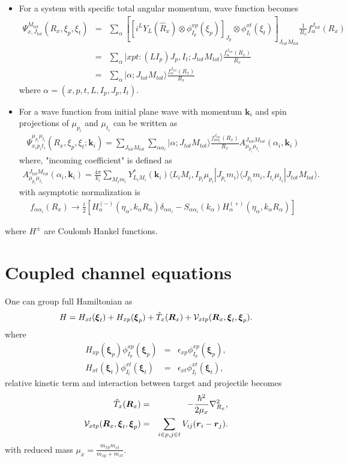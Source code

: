 \documentclass[11pt]{book}
\def\bm{\boldsymbol}
\def\vk{{\bm k}}
\def\vr{{\bm r}}
\def\la{\langle}
\def\ra{\rangle}
\newcommand{\bea}{\begin{eqnarray}}
\newcommand{\eea}{\end{eqnarray}}
\newcommand{\no}{\nonumber \\}
\begin{document}
\begin{itemize} 
\item For a system with specific total angular momentum, wave function becomes
\bea 
\Psi_{x,J_{tot}}^{M_{tot}}(R_x,\xi_p,\xi_t)
&=&\sum_{\alpha} \left[ 
    \left[i^{L} Y_{L}(\hat{R}_x)\otimes \phi^{xp}_{I_p}(\xi_p)\right]_{J_p} 
    \otimes \phi^{xt}_{I_t}(\xi_t)\right]_{J_{tot}M_{tot}}
    \frac{1}{R_x}f_{\alpha}^{J_{tot}}(R_x) \no 
&=&\sum_{\alpha} |xpt:(L I_p) J_p,I_t;J_{tot} M_{tot}\ra 
    \frac{f_{\alpha}^{J_{tot}}(R_x) }{R_x} \no 
&=&\sum_{\alpha} |\alpha; J_{tot} M_{tot}\ra \frac{f_{\alpha}^{J_{tot}}(R_x) }{R_x}
\eea 
where $\alpha=(x,p,t,L,I_p,J_p,I_t)$.
 
\item For a wave function from initial plane wave with momentum $\vk_i$ and spin projections of
    $\mu_{p_i}$ and $\mu_{t_i}$ can be written as 
\bea 
\Psi_{x_ip_it_i}^{\mu_{p_i}\mu_{t_i}}(R_x,\xi_p,\xi_t; \vk_i)
=\sum_{J_{tot}M_{tot}}\sum_{\alpha \alpha_i}
  |\alpha;J_{tot}M_{tot}\ra 
   \frac{f^{J_{tot}}_{\alpha \alpha_i}(R_x)  }{R_x} 
   A^{J_{tot} M_{tot}}_{\mu_{p_i}\mu_{t_i}}(\alpha_i,\vk_i)
\eea  
where, "incoming coefficient" is defined as
\bea 
A^{J_{tot} M_{tot}}_{\mu_{p_i}\mu_{t_i}}(\alpha_i,\vk_i)
=\frac{4\pi}{k_i}\sum_{M_i m_i} Y^*_{L_iM_i}(\vk_i)
  \la L_iM_i,I_{p_i} \mu_{p_i}| J_{p_i} m_i\ra 
  \la J_{p_i} m_i,I_{t_i}\mu_{t_i}|J_{tot} M_{tot}\ra. 
\eea  
with asymptotic normalization is 
\bea 
f_{\alpha\alpha_i}(R_x)\to 
\frac{i}{2}[H_\alpha^{(-)}(\eta_\alpha,k_\alpha R_\alpha)\delta_{\alpha\alpha_i}
           -S_{\alpha\alpha_i}(k_\alpha) H_\alpha^{(+)}(\eta_\alpha,k_\alpha R_\alpha)]
\eea 

\end{itemize}

where $H^{\pm}$ are Coulomb Hankel functions.

\section{Coupled channel equations}

One can group full Hamiltonian as
\bea
H= H_{xt}({\bm \xi}_t)+H_{xp}({\bm \xi}_p)+\hat{T}_x({\bm R}_x)+{\cal V}_{xtp}({\bm R}_x,{\bm \xi}_t,{\bm \xi}_p).
\eea 
where 
\bea 
H_{xp}({\bm \xi}_p) \phi^{xp}_{I_p}({\bm \xi}_p)&=&\epsilon_{xp}\phi_{I_p}^{xp}({\bm \xi}_p),\no 
H_{xt}({\bm \xi}_t) \phi^{xt}_{I_t}({\bm \xi}_t)&=&\epsilon_{xt}\phi_{I_t}^{xt}({\bm \xi}_t),
\eea 
relative kinetic term and interaction between target and projectile becomes 
\bea 
\hat{T}_x({\bm R}_x)&=&-\frac{\hbar^2}{2\mu_x}\nabla_{R_x}^2,\no 
{\cal V}_{xtp}({\bm R}_x,{\bm \xi}_t,{\bm \xi}_p)&=&\sum_{i\in p, j\in t} V_{ij}(\vr_i-\vr_j).
\eea 
with reduced mass $\mu_x=\frac{m_{xp}m_{xt}}{m_{xp}+m_{xt}}$.
\end{document}
